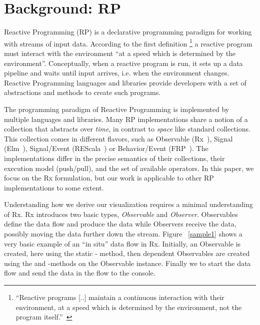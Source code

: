 \section{Background:  RP}%
\label{background}%
\label{nutshell}

Reactive Programming (RP) is a declarative programming paradigm for
working with streams of input data.  According to the first definition%
\footnote{ ``Reactive programs [..] maintain a continuous interaction
with their environment, at a speed which is determined by the
environment, not the program itself.''~\cite{berry1989real} } a reactive
program must interact with the environment ``at a speed which is
determined by the environment''.  Conceptually, when a reactive program
is run, it sets up a data pipeline and waits until input arrives, i.e.
when the environment changes.  Reactive Programming languages and
libraries provide developers with a set of abstractions and methods to
create such programs.

The programming paradigm of Reactive Programming is implemented by
multiple languages and libraries.  Many RP implementations share a
notion of a collection that abstracts over \emph{time}, in contrast to
\emph{space} like standard collections.  This collection comes in
different flavors, such as Observable (Rx~\cite{meijer2010subject}),
Signal (Elm~\cite{czaplicki2012elm}), Signal/Event (REScala~\cite{salvaneschi2014rescala})
or Behavior/Event (FRP~\cite {elliott1997functional}).  The
implementations differ in the precise semantics of their collections,
their execution model (push/pull), and the set of available operators.
In this paper, we focus on the Rx formulation, but our work is
applicable to other RP implementations to some extent.

Understanding how we derive our visualization requires a minimal
understanding of Rx.  Rx introduces two basic types, \emph{Observable}
and \emph{Observer}.  Observables define the data flow and produce the
data while Observers receive the data, possibly moving the data further
down the stream.  Figure~%
\ref{sample1} shows a very basic example of an ``in situ'' data flow in
Rx.  Initially, an Observable is created, here using the static -%
method, then dependent Observables are created using the  and
-methods on the Observable instance.  Finally we 
to start the data flow and send the data in the flow to the console.

